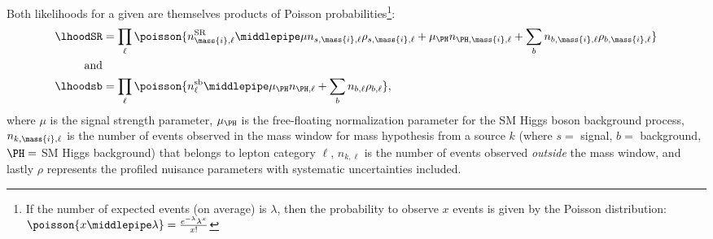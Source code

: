 Both likelihoods for a given  are themselves products of Poisson probabilities\footnote
{
    If the number of expected events (on average) is $\lambda$, then the probability to observe $x$ events is given by the Poisson distribution:
    $\poisson{x \middlepipe \lambda} = \frac{e^{-\lambda} \lambda^x}{x!}$
}:
\begin{align*}
    \lhoodSR &= \prod_\ell{
        \poisson{
            n^\text{SR}_{\mass{i},\ell}
            \middlepipe
            \mu n_{s, \mass{i}, \ell} \rho_{s, \mass{i}, \ell} + \mu_\PH n_{\PH, \mass{i}, \ell} + 
            \sum_b{
                n_{b, \mass{i}, \ell} \rho_{b, \mass{i}, \ell}
                }
            }
    }
    \\
    \text{and} &
    \\
    \lhoodsb &= \prod_\ell{
        \poisson{
            n^\text{sb}_{\ell}
            \middlepipe
            \mu_\PH n_{\PH, \ell} + 
            \sum_b{
                n_{b, \ell} \rho_{b, \ell}
                }
            }
    },
\end{align*}
where $\mu$ is the signal strength parameter,
$\mu_\PH$ is the free-floating normalization parameter for the SM Higgs boson background process,
$n_{k, \mass{i}, \ell}$ is the number of events observed in the mass window for mass hypothesis  from a source $k$ (where $s=$ signal, $b=$ background, $\PH=$ SM Higgs background) that belongs to lepton category $\ell$,
$n_{k, \ell}$ is the number of events observed \emph{outside} the mass window,
and lastly $\rho$ represents the profiled nuisance parameters with systematic uncertainties included.

